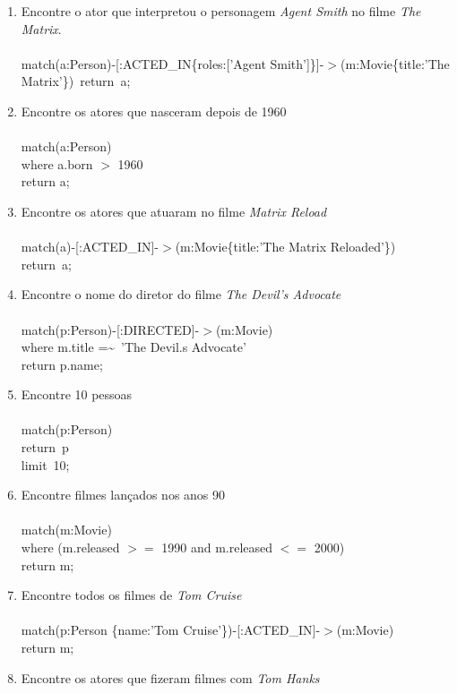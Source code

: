 \documentclass[a4paper, 12pt]{article}
\begin{document}
\begin{enumerate}
\item Encontre o ator que interpretou o personagem \emph{Agent Smith} no filme \emph{The Matrix}. \\ \\
  match(a:Person)-[:ACTED\_IN\{roles:['Agent Smith']\}]-$>$(m:Movie\{title:'The Matrix'\})\
  return\ a; \\
\item Encontre os atores que nasceram depois de 1960 \\ \\
match(a:Person) \\
where a.born $>$ 1960 \\
return a;
\item Encontre os atores que atuaram no filme \emph{Matrix Reload} \\ \\
  match(a)-[:ACTED\_IN]-$>$(m:Movie\{title:'The Matrix Reloaded'\}) \\
  return\ a; \\
\item Encontre o nome do diretor do filme \emph{The Devil's Advocate} \\ \\
  match(p:Person)-[:DIRECTED]-$>$(m:Movie) \\
  where m.title =\textasciitilde\ 'The Devil.s Advocate' \\
  return p.name; \\
\item Encontre 10 pessoas \\ \\
  match(p:Person) \\
  return\ p \\
  limit\ 10; \\
\item Encontre filmes lançados nos anos 90 \\ \\
  match(m:Movie) \\
  where (m.released $>=$ 1990 and m.released $<=$ 2000) \\
  return m;
\item Encontre todos os filmes de \emph{Tom Cruise} \\ \\
  match(p:Person \{name:'Tom Cruise'\})-[:ACTED\_IN]-$>$(m:Movie) \\
  return m; \\
\item Encontre os atores que fizeram filmes com \emph{Tom Hanks} \\

\end{enumerate}
\end{document}
